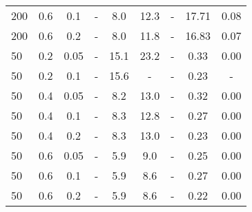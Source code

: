\begin{tabular}{l c c c c c c c c }
200 & 0.6 & 0.1 & - & 8.0 & 12.3 & - & 17.71 & 0.08 \\
200 & 0.6 & 0.2 & - & 8.0 & 11.8 & - & 16.83 & 0.07 \\
50 & 0.2 & 0.05 & - & 15.1 & 23.2 & - & 0.33 & 0.00 \\
50 & 0.2 & 0.1 & - & 15.6 & - & - & 0.23 & - \\
50 & 0.4 & 0.05 & - & 8.2 & 13.0 & - & 0.32 & 0.00 \\
50 & 0.4 & 0.1 & - & 8.3 & 12.8 & - & 0.27 & 0.00 \\
50 & 0.4 & 0.2 & - & 8.3 & 13.0 & - & 0.23 & 0.00 \\
50 & 0.6 & 0.05 & - & 5.9 & 9.0 & - & 0.25 & 0.00 \\
50 & 0.6 & 0.1 & - & 5.9 & 8.6 & - & 0.27 & 0.00 \\
50 & 0.6 & 0.2 & - & 5.9 & 8.6 & - & 0.22 & 0.00 \\
\hline
\end{tabular}

